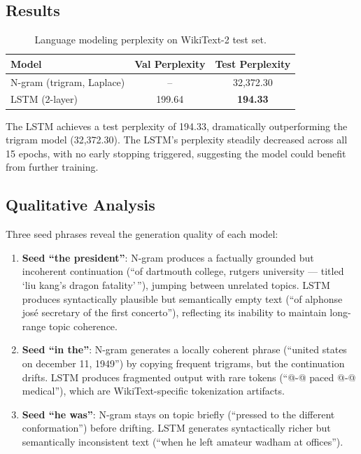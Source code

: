 \documentclass[12pt,a4paper]{article}
\begin{document}
\subsection{Results}

\begin{table}[H]
\centering
\caption{Language modeling perplexity on WikiText-2 test set.}
\label{tab:q5_results}
\begin{tabular}{lcc}
\toprule
\textbf{Model} & \textbf{Val Perplexity} & \textbf{Test Perplexity} \\
\midrule
N-gram (trigram, Laplace) & -- & 32{,}372.30 \\
LSTM (2-layer)            & 199.64 & \textbf{194.33} \\
\bottomrule
\end{tabular}
\end{table}

The LSTM achieves a test perplexity of 194.33, dramatically outperforming the trigram model (32{,}372.30). The LSTM's perplexity steadily decreased across all 15 epochs, with no early stopping triggered, suggesting the model could benefit from further training.

\subsection{Qualitative Analysis}

Three seed phrases reveal the generation quality of each model:

\begin{enumerate}
    \item \textbf{Seed ``the president''}: N-gram produces a factually grounded but incoherent continuation (``of dartmouth college, rutgers university — titled `liu kang's dragon fatality'\,''), jumping between unrelated topics. LSTM produces syntactically plausible but semantically empty text (``of alphonse josé secretary of the first concerto''), reflecting its inability to maintain long-range topic coherence.

    \item \textbf{Seed ``in the''}: N-gram generates a locally coherent phrase (``united states on december 11, 1949'') by copying frequent trigrams, but the continuation drifts. LSTM produces fragmented output with rare tokens (``@-@ paced @-@ medical''), which are WikiText-specific tokenization artifacts.

    \item \textbf{Seed ``he was''}: N-gram stays on topic briefly (``pressed to the different conformation'') before drifting. LSTM generates syntactically richer but semantically inconsistent text (``when he left amateur wadham at offices'').
\end{enumerate}
\end{document}
